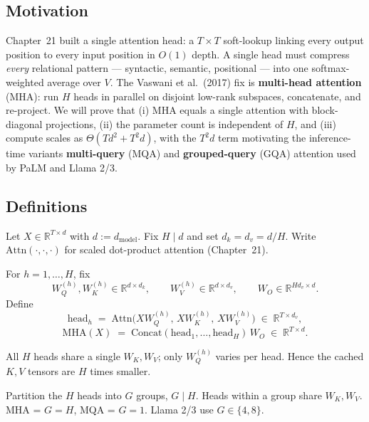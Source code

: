 \subsection*{Motivation}

Chapter~21 built a single attention head: a $T \times T$ soft-lookup linking every output position to every input position in $O(1)$ depth. A single head must compress \emph{every} relational pattern --- syntactic, semantic, positional --- into one softmax-weighted average over $V$. The Vaswani et al.~(2017) fix is \textbf{multi-head attention} (MHA): run $H$ heads in parallel on disjoint low-rank subspaces, concatenate, and re-project. We will prove that (i) MHA equals a single attention with block-diagonal projections, (ii) the parameter count is independent of $H$, and (iii) compute scales as $\Theta(T d^2 + T^2 d)$, with the $T^2 d$ term motivating the inference-time variants \textbf{multi-query} (MQA) and \textbf{grouped-query} (GQA) attention used by PaLM and Llama 2/3.

\subsection*{Definitions}

Let $X \in \mathbb{R}^{T \times d}$ with $d := d_{\mathrm{model}}$. Fix $H \mid d$ and set $d_k = d_v = d/H$. Write $\mathrm{Attn}(\cdot,\cdot,\cdot)$ for scaled dot-product attention (Chapter~21).

\begin{definition}
\label{def:mha}
For $h = 1, \dots, H$, fix
\[
W_Q^{(h)}, W_K^{(h)} \in \mathbb{R}^{d \times d_k}, \qquad W_V^{(h)} \in \mathbb{R}^{d \times d_v}, \qquad W_O \in \mathbb{R}^{H d_v \times d}.
\]
Define
\[
\mathrm{head}_h \;=\; \mathrm{Attn}\bigl(X W_Q^{(h)},\, X W_K^{(h)},\, X W_V^{(h)}\bigr) \;\in\; \mathbb{R}^{T \times d_v},
\]
\[
\boxed{\;\mathrm{MHA}(X) \;=\; \mathrm{Concat}(\mathrm{head}_1,\dots,\mathrm{head}_H)\, W_O \;\in\; \mathbb{R}^{T \times d}.\;}
\]
\end{definition}

\begin{definition}
All $H$ heads share a single $W_K, W_V$; only $W_Q^{(h)}$ varies per head. Hence the cached $K,V$ tensors are $H$ times smaller.
\end{definition}

\begin{definition}
Partition the $H$ heads into $G$ groups, $G \mid H$. Heads within a group share $W_K, W_V$. MHA = $G = H$, MQA = $G = 1$. Llama 2/3 use $G \in \{4, 8\}$.
\end{definition}

